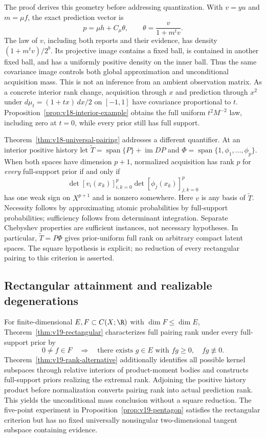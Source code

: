 The proof derives this geometry before addressing quantization. With
$v=yu$ and $m=\mu f$, the exact prediction vector is
\[
 p=\mu h+C_\mu\theta,\qquad
 \theta=\frac{v}{1+m^tv}.
\]
The law of $v$, including both reports and their evidence, has density
$(1+m^tv)/2^b$. Its projective image contains a fixed ball, is contained
in another fixed ball, and has a uniformly positive density on the
inner ball. Thus the same covariance image controls both global
approximation and unconditional acquisition mass. This is not an
inference from an ambient observation matrix. As a concrete interior
rank change, acquisition through $x$ and prediction through $x^2$ under
$d\mu_t=(1+tx)\,dx/2$ on $[-1,1]$ have covariance proportional to
$t$. Proposition~\ref{prop:v18-interior-example} obtains the full
uniform $t^2M^{-2}$ law, including zero at $t=0$, while every prior
still has full support.

Theorem~\ref{thm:v18-universal-pairing} addresses a different
quantifier. At an interior positive history let
$\widetilde T=\operatorname{span}\{P\}+\operatorname{im}DP$ and
$\Phi=\operatorname{span}\{1,\phi_1,\ldots,\phi_p\}$. When both
spaces have dimension $p+1$, normalized acquisition has rank $p$ for
\emph{every} full-support prior if and only if
\[
 \det[v_i(x_k)]_{i,k=0}^p\det[\phi_j(x_k)]_{j,k=0}^p
\]
has one weak sign on $X^{p+1}$ and is nonzero somewhere. Here $v$ is
any basis of $\widetilde T$. Necessity follows by approximating atomic
probabilities by full-support probabilities; sufficiency follows from
determinant integration. Separate Chebyshev properties are sufficient
instances, not necessary hypotheses. In particular,
$\widetilde T=P\Phi$ gives prior-uniform full rank on arbitrary compact
latent spaces. The square hypothesis is explicit; no reduction of every
rectangular pairing to this criterion is asserted.

\subsection{Rectangular attainment and realizable degenerations}
For finite-dimensional $E,F\subset C(X;\R)$ with $\dim F\le\dim E$,
Theorem~\ref{thm:v19-rectangular} characterizes full pairing rank
under every full-support prior by
\[
 0\ne f\in F\quad\Longrightarrow\quad
 \text{there exists }g\in E\text{ with }fg\ge0,\quad fg\not\equiv0.
\]
Theorem~\ref{thm:v19-rank-alternative} additionally identifies all
possible kernel subspaces through relative interiors of product-moment
bodies and constructs full-support priors realizing the extremal rank.
Adjoining the positive history product before normalization converts
pairing rank into actual prediction rank. This yields the unconditional
mass conclusion without a square reduction. The five-point experiment
in Proposition~\ref{prop:v19-pentagon} satisfies the rectangular
criterion but has no fixed universally nonsingular two-dimensional
tangent subspace containing evidence.

